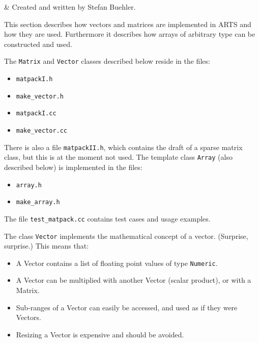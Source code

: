 %
%
\label{sec:matpack}


%
%
 & Created and written by Stefan Buehler.\\
\stophistory




%
%

This section describes how vectors and matrices are implemented in
ARTS and how they are used. Furthermore it describes how arrays of
arbitrary type can be constructed and used.


\label{sec:matpack:files}

The \verb|Matrix| and \verb|Vector| classes described below reside in the files:
\begin{itemize}
\item \verb|matpackI.h|
\item \verb|make_vector.h|
\item \verb|matpackI.cc|
\item \verb|make_vector.cc|
\end{itemize}

There is also a file \verb|matpackII.h|, which contains the draft of a sparse
matrix class, but this is at the moment not used. The template class
\verb|Array| (also described below) is implemented in the files:
\begin{itemize}
\item \verb|array.h|
\item \verb|make_array.h|
\end{itemize}

The file \verb|test_matpack.cc| contains test cases and usage
examples. 

\label{sec:matpack:vectors}

The class \verb|Vector| implements the mathematical concept of a
vector. (Surprise, surprise.) This means that:
\begin{itemize}
\item A Vector contains a list of floating point values of type \verb|Numeric|.
\item A Vector can be multiplied with another Vector (scalar product),
  or with a Matrix.
\item Sub-ranges of a Vector can easily be accessed, and used as if
  they were Vectors.
\item Resizing a Vector is expensive and should be avoided.
\end{itemize}

